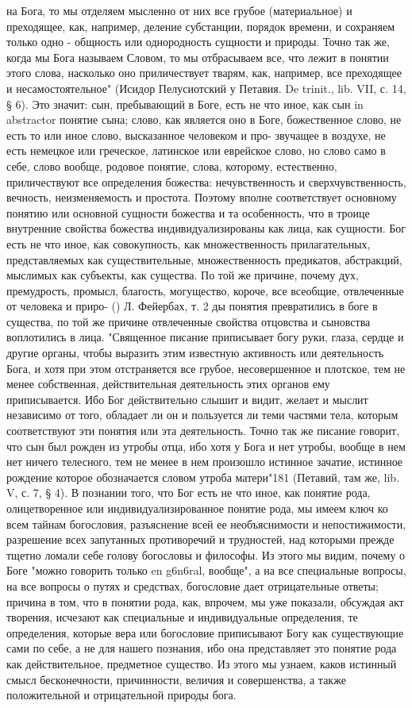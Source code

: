 \documentclass[12pt,oneside]{book}
\begin{document}
на Бога, то мы отделяем мысленно от них все грубое (материальное) и преходящее, как, например, деление субстанции, порядок времени, и сохраняем только одно - общность или однородность сущности и природы. Точно так же, когда мы Бога называем Словом, то мы отбрасываем все, что лежит в понятии этого слова, насколько оно приличествует тварям, как, например, все преходящее и несамостоятельное" (Исидор Пелусиотский у Петавия. De trinit., lib. VII, с. 14, § 6). Это значит: сын, пребывающий в Боге, есть не что иное, как сын in abstractor понятие сына; слово, как является оно в Боге, божественное слово, не есть то или иное слово, высказанное человеком и про- звучащее в воздухе, не есть немецкое или греческое, латинское или еврейское слово, но слово само в себе, слово вообще, родовое понятие, слова, которому, естественно, приличествуют все определения божества: нечувственность и сверхчувственность, вечность, неизменяемость и простота. Поэтому вполне соответствует основному понятию или основной сущности божества и та особенность, что в троице внутренние свойства божества индивидуализированы как лица, как сущности. Бог есть не что иное, как совокупность, как множественность прилагательных, представляемых как существительные, множественность предикатов, абстракций, мыслимых как субъекты, как существа. По той же причине, почему дух, премудрость, промысл, благость, могущество, короче, все всеобщие, отвлеченные от человека и приро- () Л. Фейербах, т. 2 ды понятия превратились в боге в существа, по той же причине отвлеченные свойства отцовства и сыновства воплотились в лица. "Священное писание приписывает богу руки, глаза, сердце и другие органы, чтобы выразить этим известную активность или деятельность Бога, и хотя при этом отстраняется все грубое, несовершенное и плотское, тем не менее собственная, действительная деятельность этих органов ему приписывается. Ибо Бог действительно слышит и видит, желает и мыслит независимо от того, обладает ли он и пользуется ли теми частями тела, которым соответствуют эти понятия или эта деятельность. Точно так же писание говорит, что сын был рожден из утробы отца, ибо хотя у Бога и нет утробы, вообще в нем нет ничего телесного, тем не менее в нем произошло истинное зачатие, истинное рождение которое обозначается словом утроба матери"181 (Петавий, там же, lib. V, с. 7, § 4). В познании того, что Бог есть не что иное, как понятие рода, олицетворенное или индивидуализированное понятие рода, мы имеем ключ ко всем тайнам богословия, разъяснение всей ее необъяснимости и непостижимости, разрешение всех запутанных противоречий и трудностей, над которыми прежде тщетно ломали себе голову богословы и философы. Из этого мы видим, почему о Боге "можно говорить только en g6n6ral, вообще", а на все специальные вопросы, на все вопросы о путях и средствах, богословие дает отрицательные ответы; причина в том, что в понятии рода, как, впрочем, мы уже показали, обсуждая акт творения, исчезают как специальные и индивидуальные определения, те определения, которые вера или богословие приписывают Богу как существующие сами по себе, а не для нашего познания, ибо она представляет это понятие рода как действительное, предметное существо. Из этого мы узнаем, каков истинный смысл бесконечности, причинности, величия и совершенства, а также положительной и отрицательной природы бога. 
\end{document}
